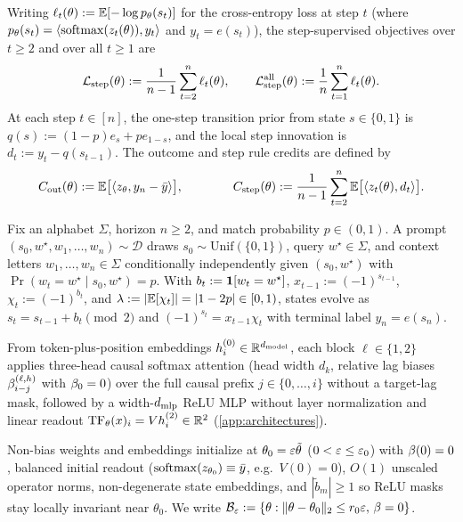 Writing $\ell_t(\theta) := \mathbb E[-\log p_\theta(s_t)]$ for the cross-entropy loss at step $t$ (where $p_\theta(s_t) = \left\langle \operatorname{softmax}(z_t(\theta)),y_t\right\rangle$ and $y_t = e(s_t)$), the step-supervised objectives over $t \ge 2$ and over all $t \ge 1$ are
\begin{equation}
 \mathcal L_{\mathrm{step}}(\theta) := \frac{1}{n-1}\sum_{t=2}^n \ell_t(\theta),
 \qquad
 \mathcal L_{\mathrm{step}}^{\mathrm{all}}(\theta) := \frac{1}{n}\sum_{t=1}^n \ell_t(\theta).
 \label{eq:step-objectives}
\end{equation}
At each step $t \in [n]$, the one-step transition prior from state $s \in \{0,1\}$ is $q(s) := (1-p)e_s + p e_{1-s}$, and the local step innovation is $d_t := y_t - q(s_{t-1})$. The outcome and step rule credits are defined by\label{tab:credit-summary}
\[
  C_{\mathrm{out}}(\theta) := \mathbb E\bigl[\langle z_\theta, y_n - \bar y\rangle\bigr],
  \qquad\qquad
  C_{\mathrm{step}}(\theta) := \frac{1}{n-1}\sum_{t=2}^n \mathbb E\bigl[\langle z_t(\theta), d_t\rangle\bigr].
\]

\begin{definition}
\label{def:task}
Fix an alphabet $\Sigma$, horizon $n \ge 2$, and match probability $p \in (0,1)$. A prompt $(s_0, w^\star, w_1, \ldots, w_n) \sim \mathcal D$ draws $s_0 \sim \mathrm{Unif}(\{0,1\})$, query $w^\star \in \Sigma$, and context letters $w_1, \ldots, w_n \in \Sigma$ conditionally independently given $(s_0, w^\star)$ with $\Pr(w_t = w^\star \mid s_0, w^\star) = p$. With $b_t := \mathbf 1[w_t = w^\star]$, $x_{t-1} := (-1)^{s_{t-1}}$, $\chi_t := (-1)^{b_t}$, and $\lambda := |\mathbb E[\chi_t]| = |1-2p| \in [0,1)$, states evolve as $s_t = s_{t-1} + b_t \pmod 2$ and $(-1)^{s_t} = x_{t-1}\chi_t$ with terminal label $y_n = e(s_n)$.
\end{definition}

\begin{definition}
\label{ass:arch}
From token-plus-position embeddings $h_i^{(0)} \in \mathbb R^{d_{\mathrm{model}}}$, each block $\ell \in \{1,2\}$ applies three-head causal softmax attention (head width $d_k$, relative lag biases $\beta_{i-j}^{(\ell,h)}$ with $\beta_0 = 0$) over the full causal prefix $j \in \{0,\ldots,i\}$ without a target-lag mask, followed by a width-$d_{\mathrm{mlp}}$ ReLU MLP without layer normalization and linear readout $\operatorname{TF}_\theta(x)_i = V h_i^{(2)} \in \mathbb R^2$ (\cref{app:architectures}).
\end{definition}

\begin{assumption}
\label{ass:init}
Non-bias weights and embeddings initialize at $\theta_0 = \varepsilon\tilde\theta$ ($0 < \varepsilon \le \varepsilon_0$) with $\beta(0) = 0$, balanced initial readout ($\operatorname{softmax}(z_{\theta_0}) \equiv \bar y$, e.g.\ $V(0) = 0$), $O(1)$ unscaled operator norms, non-degenerate state embeddings, and $|\tilde b_m| \ge 1$ so ReLU masks stay locally invariant near $\theta_0$. We write $\mathcal B_{\varepsilon} := \{\theta : \|\theta - \theta_0\|_2 \le r_0\varepsilon,\, \beta = 0\}$.
\end{assumption}

